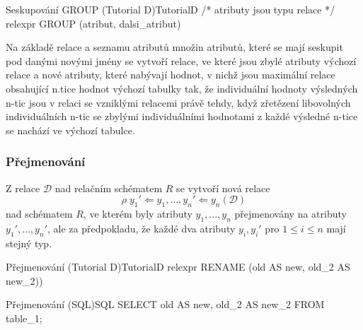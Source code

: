 \begin{upcode}{Seskupování GROUP (Tutorial D)}{}{TutorialD}
/* atributy jsou typu relace */
relexpr GROUP (atribut, dalsi_atribut)
\end{upcode}
Na základě relace a seznamu atributů množin atributů, které se mají seskupit pod danými novými jmény se vytvoří relace, ve které jsou zbylé atributy výchozí relace a nové atributy, které nabývají hodnot, v nichž jsou maximální relace obsahující n.tice hodnot výchozí tabulky tak, že individuální hodnoty výsledných n-tic jsou v relaci se vzniklými relacemi právě tehdy, když zřetězení libovolných individuálních n-tic se zbylými individuálními hodnotami z každé výsledné n-tice se nachází ve výchozí tabulce.

\subsubsection{Přejmenování}
Z relace $\mathcal{D}$ nad relačním schématem $R$ se vytvoří nová relace
$$
\rho \; y_{1}' \Leftarrow y_{1}, \ldots, y_{n}' \Leftarrow y_{n} (\mathcal{D})
$$
nad schématem $R$, ve kterém byly atributy $y_{1}, \ldots, y_{n}$ přejmenovány na atributy $y_{1}', \ldots, y_{n}'$, ale za předpokladu, že každé dva atributy $y_{i}, y_{i}' \text{ pro } 1 \leq i \leq n$ mají stejný typ.
\begin{upcode}{Přejmenování (Tutorial D)}{}{TutorialD}
relexpr RENAME (old AS new, old_2 AS new_2))
\end{upcode}
\begin{upcode}{Přejmenování (SQL)}{}{SQL}
SELECT old AS new, old_2 AS new_2 FROM table_1;
\end{upcode}

